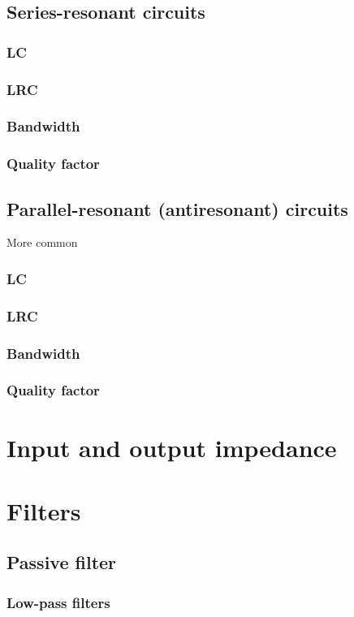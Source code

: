 \documentclass{report}
\begin{document}
\subsection{Series-resonant circuits}
\subsubsection{LC}
\subsubsection{LRC}
\subsubsection{Bandwidth}
\subsubsection{Quality factor}
\subsection{Parallel-resonant (antiresonant) circuits}
More common
\subsubsection{LC}
\subsubsection{LRC}
\subsubsection{Bandwidth}
\subsubsection{Quality factor}
\section{Input and output impedance}
\section{Filters}
\subsection{Passive filter}
\subsubsection{Low-pass filters}
\end{document}

